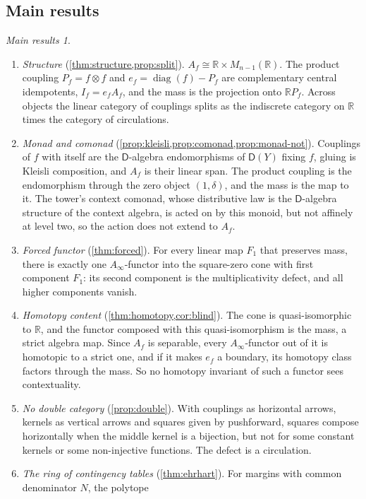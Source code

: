 \documentclass[11pt]{article}
\theoremstyle{definition}
\theoremstyle{remark}
\newtheorem*{mainthm}{Main results}
\newcommand{\D}{\mathsf{D}}
\newcommand{\R}{\mathbb{R}}
\newcommand{\diag}{\operatorname{diag}}
\begin{document}
\subsection{Main results}
\begin{mainthm}
\leavevmode
\begin{enumerate}[label=(\Alph*),leftmargin=*]
\item \emph{Structure} (\cref{thm:structure,prop:split}). $A_f\cong\R\times M_{n-1}(\R)$. The product coupling
  $P_f=f\otimes f$ and $e_f=\diag(f)-P_f$ are complementary central idempotents, $I_f=e_fA_f$, and the mass is the
  projection onto $\R P_f$. Across objects the linear category of couplings splits as the indiscrete category on $\R$
  times the category of circulations.
\item \emph{Monad and comonad} (\cref{prop:kleisli,prop:comonad,prop:monad-not}). Couplings of $f$ with itself are the $\D$-algebra
  endomorphisms of $\D(Y)$ fixing $f$, gluing is Kleisli composition, and $A_f$ is their linear span. The product coupling is
  the endomorphism through the zero object $(1,\delta)$, and the mass is the map to it. The tower's context comonad, whose
  distributive law is the $\D$-algebra structure of the context algebra, is acted on by this monoid, but not affinely at level
  two, so the action does not extend to $A_f$.
\item \emph{Forced functor} (\cref{thm:forced}). For every linear map $F_1$ that preserves mass, there is exactly one
  $A_\infty$-functor into the square-zero cone with first component $F_1$: its second component is the multiplicativity
  defect, and all higher components vanish.
\item \emph{Homotopy content} (\cref{thm:homotopy,cor:blind}). The cone is quasi-isomorphic to $\R$, and the functor composed
  with this quasi-isomorphism is the mass, a strict algebra map. Since $A_f$ is separable, every $A_\infty$-functor out of it
  is homotopic to a strict one, and if it makes $e_f$ a boundary, its homotopy class factors through the mass. So no
  homotopy invariant of such a functor sees contextuality.
\item \emph{No double category} (\cref{prop:double}). With couplings as horizontal arrows, kernels as vertical arrows and
  squares given by pushforward, squares compose horizontally when the middle kernel is a bijection, but not for some
  constant kernels or some non-injective functions. The defect is a circulation.
\item \emph{The ring of contingency tables} (\cref{thm:ehrhart}). For margins with common denominator $N$, the polytope

\end{enumerate}
\end{mainthm}
\end{document}
